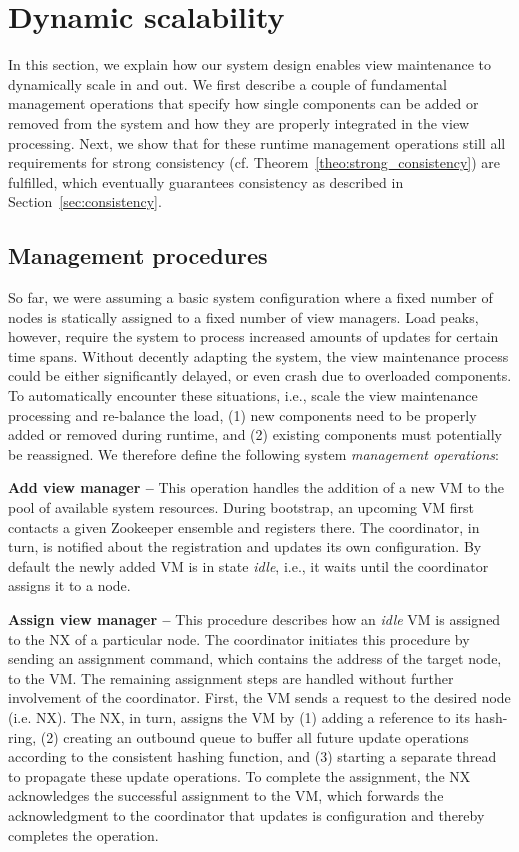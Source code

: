 \section{Dynamic scalability} 
\label{sec:dynamic_scalability} 

In this section, we explain how our system design enables view 
maintenance to dynamically scale in and out. We first describe 
a couple of fundamental management operations that specify how single 
components can be added or removed from the system and how they are 
properly integrated in the view processing. Next, we show that for these 
runtime management operations still all requirements for strong consistency 
(cf. Theorem~\ref{theo:strong_consistency}) are fulfilled, which
eventually guarantees consistency as described in 
Section~\ref{sec:consistency}. 

\subsection{Management procedures} 
\label{sec:management_procedures} 

So far, we were assuming a basic system configuration where a fixed 
number of nodes is statically assigned to a fixed number of view 
managers. Load peaks, however, require the system to process increased 
amounts of updates for certain time spans. Without decently adapting the 
system, the view maintenance process could be either significantly delayed, 
or even crash due to overloaded components. To automatically 
encounter these situations, i.e., scale the view maintenance processing 
and re-balance the load, (1) new components need to be properly added or 
removed during runtime, and (2) existing components must potentially be 
reassigned. We therefore define the following system \textit{management 
operations}: 

\noindent
\textbf{Add view manager -- } This operation handles the addition of a 
new VM to the pool of available system resources. During bootstrap, an 
upcoming VM first contacts a given Zookeeper ensemble and registers 
there. The coordinator, in turn, is notified about the registration and 
updates its own configuration. By default the newly added VM is in state 
\textit{idle}, i.e., it waits until the coordinator assigns it to a 
node. 

\noindent
\textbf{Assign view manager -- }This procedure describes how an 
\textit{idle} VM is assigned to the NX of a particular node. The 
coordinator initiates this procedure by sending an assignment command, 
which contains the address of the target node, to the VM. The remaining 
assignment steps are handled without further involvement of the 
coordinator. First, the VM sends a request to the desired node (i.e. 
NX). The NX, in turn, assigns the VM by (1) adding a reference to its 
hash-ring, (2) creating an outbound queue to buffer all future update 
operations according to the consistent hashing function, and (3) 
starting a separate thread to propagate these update operations. To 
complete the assignment, the NX acknowledges the successful assignment 
to the VM, which forwards the acknowledgment to the coordinator that 
updates is configuration and thereby completes the operation. 

